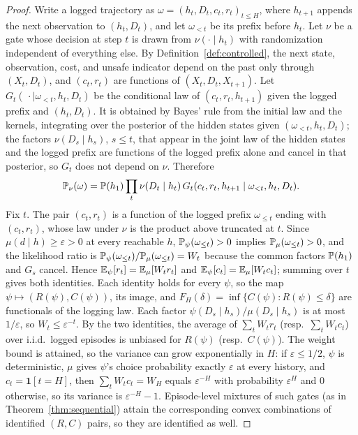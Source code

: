 \begin{proof}
Write a logged trajectory as $\omega=(h_t,D_t,c_t,r_t)_{t\le H}$, where $h_{t+1}$
appends the next observation to $(h_t,D_t)$, and let $\omega_{<t}$ be its prefix before $h_t$.
Let $\nu$ be a gate whose decision at step $t$ is drawn from $\nu(\cdot\mid h_t)$ with
randomization independent of everything else. By Definition~\ref{def:controlled}, the next
state, observation, cost, and unsafe indicator depend on the past only through $(X_t,D_t)$, and
$(c_t,r_t)$ are functions of $(X_t,D_t,X_{t+1})$. Let $G_t(\,\cdot\mid\omega_{<t},h_t,D_t)$ be
the conditional law of $(c_t,r_t,h_{t+1})$ given the logged prefix and $(h_t,D_t)$. It is
obtained by Bayes' rule from the initial law and the kernels, integrating over the posterior of
the hidden states given $(\omega_{<t},h_t,D_t)$; the factors $\nu(D_s\mid h_s)$, $s\le t$, that
appear in the joint law of the hidden states and the logged prefix are functions of the logged
prefix alone and cancel in that posterior, so $G_t$ does not depend on $\nu$. Therefore
\[
  \mathbb{P}_\nu(\omega)=\mathbb{P}(h_1)\prod_{t}\nu(D_t\mid h_t)\,G_t(c_t,r_t,h_{t+1}\mid\omega_{<t},h_t,D_t).
\]
Fix $t$. The pair $(c_t,r_t)$ is a function of the logged prefix $\omega_{\le t}$ ending with
$(c_t,r_t)$, whose law under $\nu$ is the product above truncated at $t$. Since
$\mu(d\mid h)\ge\varepsilon>0$ at every reachable $h$, $\mathbb{P}_\psi(\omega_{\le t})>0$ implies
$\mathbb{P}_\mu(\omega_{\le t})>0$, and the likelihood ratio is
$\mathbb{P}_\psi(\omega_{\le t})/\mathbb{P}_\mu(\omega_{\le t})=W_t$ because the common factors
$\mathbb{P}(h_1)$ and $G_s$ cancel. Hence $\mathbb{E}_\psi[r_t]=\mathbb{E}_\mu[W_tr_t]$ and
$\mathbb{E}_\psi[c_t]=\mathbb{E}_\mu[W_tc_t]$; summing over $t$ gives both identities. Each identity holds for
every $\psi$, so the map $\psi\mapsto(R(\psi),C(\psi))$, its image, and
$F_H(\delta)=\inf\{C(\psi):R(\psi)\le\delta\}$ are functionals of the logging law. Each factor
$\psi(D_s\mid h_s)/\mu(D_s\mid h_s)$ is at most $1/\varepsilon$, so $W_t\le\varepsilon^{-t}$. By the two identities, the average of
$\sum_tW_tr_t$ (resp.\ $\sum_tW_tc_t$) over i.i.d.\ logged episodes is unbiased for $R(\psi)$ (resp.\
$C(\psi)$). The weight bound is attained, so the variance can grow exponentially in $H$: if
$\varepsilon\le1/2$, $\psi$ is deterministic, $\mu$ gives $\psi$'s choice probability exactly
$\varepsilon$ at every history, and $c_t=\mathbf 1[t=H]$, then $\sum_tW_tc_t=W_H$ equals
$\varepsilon^{-H}$ with probability $\varepsilon^{H}$ and $0$ otherwise, so its variance is
$\varepsilon^{-H}-1$.
Episode-level mixtures of such gates (as in Theorem~\ref{thm:sequential}) attain the
corresponding convex combinations of identified $(R,C)$ pairs, so they are identified as well.
\end{proof}

